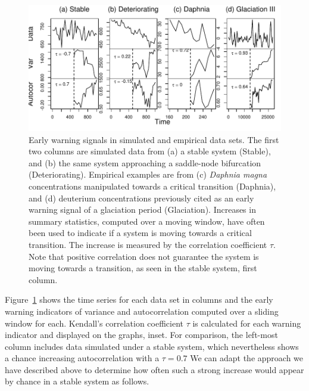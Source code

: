 \documentclass[authoryear,review,11pt]{elsarticle}
\begin{document}
\begin{figure}
   \begin{center}
     \includegraphics[width=\linewidth]{figures/Fig2.pdf}
     \caption{Early warning signals in simulated and empirical data sets.  
     The first two columns are simulated data from (a) a stable system (Stable), 
     and (b) the same system approaching a saddle-node bifurcation (Deteriorating).  
     Empirical examples are from (c) \emph{Daphnia magna} concentrations manipulated towards a critical transition (Daphnia), 
     and (d) deuterium concentrations previously cited as an early warning signal of a glaciation period (Glaciation). 
     Increases in summary statistics, computed over a moving window, 
     have often been used to indicate if a system is moving towards a critical transition.  
     The increase is measured by the correlation coefficient $\tau$.  
     Note that positive correlation does not guarantee the system is moving towards a transition, 
     as seen in the stable system, first column.}
     \label{fig:summary_stats}
  \end{center}
 \end{figure}


Figure~\ref{fig:summary_stats} shows the time series for each data set in columns
and the early warning indicators  of variance and autocorrelation
computed over a sliding window for each.
Kendall's correlation coefficient $\tau$ is calculated for each warning indicator and displayed on the graphs, inset.
For comparison, the left-most column includes data simulated under a stable system,
which nevertheless shows a chance increasing autocorrelation with a $\tau=0.7$
We can adapt the approach we have described above to determine how often such a strong increase would appear
by chance in a stable system as follows.
\end{document}
